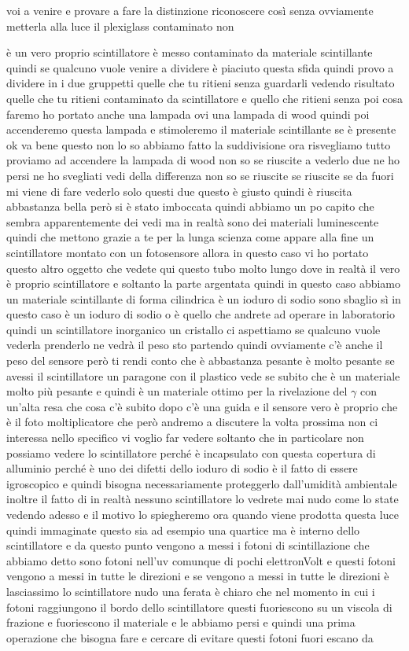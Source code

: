 {voi a venire e provare a fare la distinzione riconoscere così senza ovviamente metterla alla luce il plexiglass contaminato non

è un vero proprio scintillatore è messo contaminato da materiale scintillante quindi se qualcuno vuole venire a dividere è piaciuto questa sfida quindi provo a dividere in i due gruppetti quelle che tu ritieni senza guardarli vedendo risultato quelle che tu ritieni contaminato da scintillatore e quello che ritieni senza poi cosa faremo ho portato anche una lampada ovi una lampada di wood quindi poi accenderemo questa lampada e stimoleremo il materiale scintillante se è presente ok va bene questo non lo so abbiamo fatto la suddivisione ora risvegliamo tutto proviamo ad accendere la lampada di wood non so se riuscite a vederlo due ne ho persi ne ho svegliati vedi della differenza non so se riuscite se riuscite se da fuori mi viene di fare vederlo solo questi due questo è giusto quindi è riuscita abbastanza bella però si è stato imboccata quindi abbiamo un po capito che sembra apparentemente dei vedi ma in realtà sono dei materiali luminescente quindi che mettono grazie a te per la lunga scienza come appare alla fine un scintillatore montato con un fotosensore allora in questo caso vi ho portato questo altro oggetto che vedete qui questo tubo molto lungo dove in realtà il vero è proprio scintillatore e soltanto la parte argentata quindi in questo caso abbiamo un materiale scintillante di forma cilindrica è un ioduro di sodio sono sbaglio sì in questo caso è un ioduro di sodio o è quello che andrete ad operare in laboratorio quindi un scintillatore inorganico un cristallo ci aspettiamo se qualcuno vuole vederla prenderlo ne vedrà il peso sto partendo quindi ovviamente c'è anche il peso del sensore però ti rendi conto che è abbastanza pesante è molto pesante se avessi il scintillatore un paragone con il plastico vede se subito che è un materiale molto più pesante e quindi è un materiale ottimo per la rivelazione del $\gamma$ con un'alta resa che cosa c'è subito dopo c'è una guida e il sensore vero è proprio che è il foto moltiplicatore che però andremo a discutere la volta prossima non ci interessa nello specifico vi voglio far vedere soltanto che in particolare non possiamo vedere lo scintillatore perché è incapsulato con questa copertura di alluminio perché è uno dei difetti dello ioduro di sodio è il fatto di essere igroscopico e quindi bisogna necessariamente proteggerlo dall'umidità ambientale inoltre il fatto di in realtà nessuno scintillatore lo vedrete mai nudo come lo state vedendo adesso e il motivo lo spiegheremo ora quando viene prodotta questa luce quindi immaginate questo sia ad esempio una quartice ma è interno dello scintillatore e da questo punto vengono a messi i fotoni di scintillazione che abbiamo detto sono fotoni nell'uv comunque di pochi elettronVolt e questi fotoni vengono a messi in tutte le direzioni e se vengono a messi in tutte le direzioni è lasciassimo lo scintillatore nudo una ferata è chiaro che nel momento in cui i fotoni raggiungono il bordo dello scintillatore questi fuoriescono su un viscola di frazione e fuoriescono il materiale e le abbiamo persi e quindi una prima operazione che bisogna fare e cercare di evitare questi fotoni fuori escano da }
